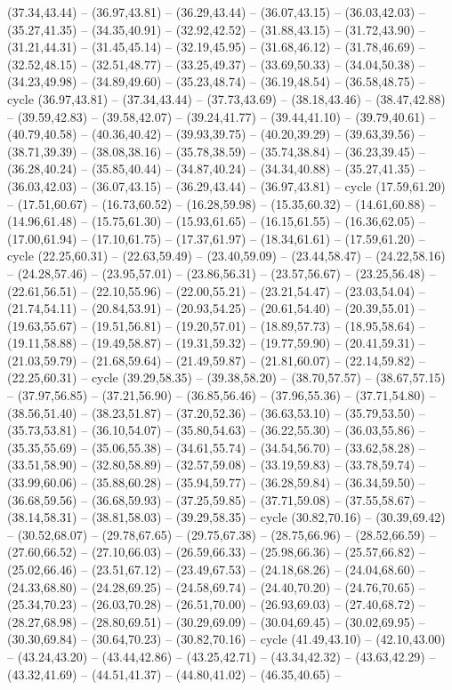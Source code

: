 {(37.34,43.44) -- (36.97,43.81) -- (36.29,43.44) -- (36.07,43.15) -- (36.03,42.03) -- (35.27,41.35) -- (34.35,40.91) -- (32.92,42.52) -- (31.88,43.15) -- (31.72,43.90) -- (31.21,44.31) -- (31.45,45.14) -- (32.19,45.95) -- (31.68,46.12) -- (31.78,46.69) -- (32.52,48.15) -- (32.51,48.77) -- (33.25,49.37) -- (33.69,50.33) -- (34.04,50.38) -- (34.23,49.98) -- (34.89,49.60) -- (35.23,48.74) -- (36.19,48.54) -- (36.58,48.75) -- cycle (36.97,43.81) -- (37.34,43.44) -- (37.73,43.69) -- (38.18,43.46) -- (38.47,42.88) -- (39.59,42.83) -- (39.58,42.07) -- (39.24,41.77) -- (39.44,41.10) -- (39.79,40.61) -- (40.79,40.58) -- (40.36,40.42) -- (39.93,39.75) -- (40.20,39.29) -- (39.63,39.56) -- (38.71,39.39) -- (38.08,38.16) -- (35.78,38.59) -- (35.74,38.84) -- (36.23,39.45) -- (36.28,40.24) -- (35.85,40.44) -- (34.87,40.24) -- (34.34,40.88) -- (35.27,41.35) -- (36.03,42.03) -- (36.07,43.15) -- (36.29,43.44) -- (36.97,43.81) -- cycle (17.59,61.20) -- (17.51,60.67) -- (16.73,60.52) -- (16.28,59.98) -- (15.35,60.32) -- (14.61,60.88) -- (14.96,61.48) -- (15.75,61.30) -- (15.93,61.65) -- (16.15,61.55) -- (16.36,62.05) -- (17.00,61.94) -- (17.10,61.75) -- (17.37,61.97) -- (18.34,61.61) -- (17.59,61.20) -- cycle (22.25,60.31) -- (22.63,59.49) -- (23.40,59.09) -- (23.44,58.47) -- (24.22,58.16) -- (24.28,57.46) -- (23.95,57.01) -- (23.86,56.31) -- (23.57,56.67) -- (23.25,56.48) -- (22.61,56.51) -- (22.10,55.96) -- (22.00,55.21) -- (23.21,54.47) -- (23.03,54.04) -- (21.74,54.11) -- (20.84,53.91) -- (20.93,54.25) -- (20.61,54.40) -- (20.39,55.01) -- (19.63,55.67) -- (19.51,56.81) -- (19.20,57.01) -- (18.89,57.73) -- (18.95,58.64) -- (19.11,58.88) -- (19.49,58.87) -- (19.31,59.32) -- (19.77,59.90) -- (20.41,59.31) -- (21.03,59.79) -- (21.68,59.64) -- (21.49,59.87) -- (21.81,60.07) -- (22.14,59.82) -- (22.25,60.31) -- cycle (39.29,58.35) -- (39.38,58.20) -- (38.70,57.57) -- (38.67,57.15) -- (37.97,56.85) -- (37.21,56.90) -- (36.85,56.46) -- (37.96,55.36) -- (37.71,54.80) -- (38.56,51.40) -- (38.23,51.87) -- (37.20,52.36) -- (36.63,53.10) -- (35.79,53.50) -- (35.73,53.81) -- (36.10,54.07) -- (35.80,54.63) -- (36.22,55.30) -- (36.03,55.86) -- (35.35,55.69) -- (35.06,55.38) -- (34.61,55.74) -- (34.54,56.70) -- (33.62,58.28) -- (33.51,58.90) -- (32.80,58.89) -- (32.57,59.08) -- (33.19,59.83) -- (33.78,59.74) -- (33.99,60.06) -- (35.88,60.28) -- (35.94,59.77) -- (36.28,59.84) -- (36.34,59.50) -- (36.68,59.56) -- (36.68,59.93) -- (37.25,59.85) -- (37.71,59.08) -- (37.55,58.67) -- (38.14,58.31) -- (38.81,58.03) -- (39.29,58.35) -- cycle (30.82,70.16) -- (30.39,69.42) -- (30.52,68.07) -- (29.78,67.65) -- (29.75,67.38) -- (28.75,66.96) -- (28.52,66.59) -- (27.60,66.52) -- (27.10,66.03) -- (26.59,66.33) -- (25.98,66.36) -- (25.57,66.82) -- (25.02,66.46) -- (23.51,67.12) -- (23.49,67.53) -- (24.18,68.26) -- (24.04,68.60) -- (24.33,68.80) -- (24.28,69.25) -- (24.58,69.74) -- (24.40,70.20) -- (24.76,70.65) -- (25.34,70.23) -- (26.03,70.28) -- (26.51,70.00) -- (26.93,69.03) -- (27.40,68.72) -- (28.27,68.98) -- (28.80,69.51) -- (30.29,69.09) -- (30.04,69.45) -- (30.02,69.95) -- (30.30,69.84) -- (30.64,70.23) -- (30.82,70.16) -- cycle (41.49,43.10) -- (42.10,43.00) -- (43.24,43.20) -- (43.44,42.86) -- (43.25,42.71) -- (43.34,42.32) -- (43.63,42.29) -- (43.32,41.69) -- (44.51,41.37) -- (44.80,41.02) -- (46.35,40.65) -- }
